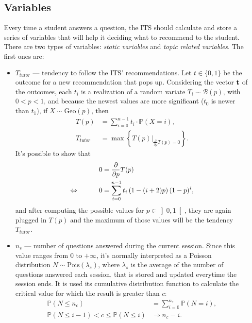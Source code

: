 \documentclass{article}
\newcommand{\0}{\mathbbold{0}}
\newcommand{\1}{\mathds{1}}
\newcommand{\LRA}{\Leftrightarrow\mkern40mu}
\newcommand{\openinter}[2]{\left]#1,#2\right[}
\begin{document}
\subsection{Variables}
Every time a student answers a question, the ITS should calculate and store a series of variables that will help it deciding what to recommend to the student.
There are two types of variables: \textsl{static variables} and \textsl{topic related variables}. The first ones are:
\begin{itemize}
    \item $T_\mathit{tutor}$ — tendency to follow the ITS' recommendations. Let $t \in \{0,1\}$ be the outcome for a new recommendation that pops up.
    Considering the vector ${\bf t}$ of the outcomes, each $t_i$ is a realization of a random variate $T_i \sim \mathcal{B}(p)$, with $0 < p < 1$, and because the newest values are more significant ($t_0$ is newer than $t_1$), if $X \sim \text{Geo}(p)$, then
    \begin{align*}
        T(p) &= \sum_{i=0}^{n-1} t_i \cdot \mathbb{P}(X = i), \\
        T_\mathit{tutor} &= \max\left\{\left.T(p)\right|_{\frac{\partial}{\partial p}T(p) = 0}\right\}.
    \end{align*}
    It's possible to show that
    \begin{alignat*}{2}
        && 0 &= \frac{\partial}{\partial p}T(p) \\
        \LRA && 0 &= \sum_{i=0}^{n-1} t_i\left(1-(i+2)p\right)(1-p)^i,
    \end{alignat*}
    and after computing the possible values for $p \in \openinter{0}{1}$, they are again plugged in $T(p)$ and the maximum of those values will be the tendency $T_\mathit{tutor}$.
    \item $n_s$ — number of questions answered during the current session. Since this value ranges from $0$ to $+\infty$, it's normally interpreted as a Poisson distribution $N \sim \text{Pois}(\lambda_s)$, where $\lambda_s$ is the average of the number of questions answered each session, that is stored and updated everytime the session ends.
    It is used its cumulative distribution function to calculate the critical value for which the result is greater than $c$:
    \begin{align*}
        \mathbb{P}(N \le n_c) &= \sum_{i=0}^{n_c} \mathbb{P}(N = i), \\
        \mathbb{P}(N \le i-1) < c \le \mathbb{P}(N \le i) &\Rightarrow n_c = i.
    \end{align*}

\end{itemize}
\end{document}
